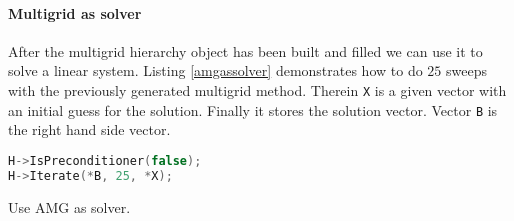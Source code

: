 \paragraph{Multigrid as solver}
After the multigrid hierarchy object has been built and filled we can use it to solve a linear system.
Listing \ref{amgassolver} demonstrates how to do $25$ sweeps with the previously generated multigrid method. Therein \verb|X| is a given vector with an initial guess for the solution. Finally it stores the solution vector. Vector \verb|B| is the right hand side vector.
\begin{Listing} 
\begin{center} 
\begin{lstlisting}[language=C++,label=listing:AmgAsSolver]
H->IsPreconditioner(false);
H->Iterate(*B, 25, *X);
\end{lstlisting}
\caption{Use AMG as solver.} 
\label{listing:amgassolver}
\end{center}
\end{Listing}

